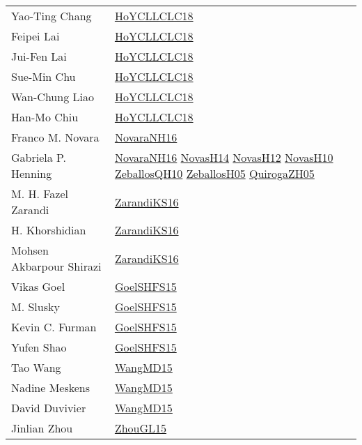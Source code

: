 {\begin{longtable}{p{4cm}p{15cm}}
Yao{-}Ting Chang & \href{papers/HoYCLLCLC18.pdf}{HoYCLLCLC18}\cite{HoYCLLCLC18} \\
Feipei Lai & \href{papers/HoYCLLCLC18.pdf}{HoYCLLCLC18}\cite{HoYCLLCLC18} \\
Jui{-}Fen Lai & \href{papers/HoYCLLCLC18.pdf}{HoYCLLCLC18}\cite{HoYCLLCLC18} \\
Sue{-}Min Chu & \href{papers/HoYCLLCLC18.pdf}{HoYCLLCLC18}\cite{HoYCLLCLC18} \\
Wan{-}Chung Liao & \href{papers/HoYCLLCLC18.pdf}{HoYCLLCLC18}\cite{HoYCLLCLC18} \\
Han{-}Mo Chiu & \href{papers/HoYCLLCLC18.pdf}{HoYCLLCLC18}\cite{HoYCLLCLC18} \\
Franco M. Novara & \href{articles/NovaraNH16.pdf}{NovaraNH16}\cite{NovaraNH16} \\
Gabriela P. Henning & \href{articles/NovaraNH16.pdf}{NovaraNH16}\cite{NovaraNH16} \href{articles/NovasH14.pdf}{NovasH14}\cite{NovasH14} \href{articles/NovasH12.pdf}{NovasH12}\cite{NovasH12} \href{articles/NovasH10.pdf}{NovasH10}\cite{NovasH10} \href{articles/ZeballosQH10.pdf}{ZeballosQH10}\cite{ZeballosQH10} \href{articles/ZeballosH05.pdf}{ZeballosH05}\cite{ZeballosH05} \href{papers/QuirogaZH05.pdf}{QuirogaZH05}\cite{QuirogaZH05} \\
M. H. Fazel Zarandi & \href{articles/ZarandiKS16.pdf}{ZarandiKS16}\cite{ZarandiKS16} \\
H. Khorshidian & \href{articles/ZarandiKS16.pdf}{ZarandiKS16}\cite{ZarandiKS16} \\
Mohsen Akbarpour Shirazi & \href{articles/ZarandiKS16.pdf}{ZarandiKS16}\cite{ZarandiKS16} \\
Vikas Goel & \href{articles/GoelSHFS15.pdf}{GoelSHFS15}\cite{GoelSHFS15} \\
M. Slusky & \href{articles/GoelSHFS15.pdf}{GoelSHFS15}\cite{GoelSHFS15} \\
Kevin C. Furman & \href{articles/GoelSHFS15.pdf}{GoelSHFS15}\cite{GoelSHFS15} \\
Yufen Shao & \href{articles/GoelSHFS15.pdf}{GoelSHFS15}\cite{GoelSHFS15} \\
Tao Wang & \href{articles/WangMD15.pdf}{WangMD15}\cite{WangMD15} \\
Nadine Meskens & \href{articles/WangMD15.pdf}{WangMD15}\cite{WangMD15} \\
David Duvivier & \href{articles/WangMD15.pdf}{WangMD15}\cite{WangMD15} \\
Jinlian Zhou & \href{papers/ZhouGL15.pdf}{ZhouGL15}\cite{ZhouGL15} \\

\end{longtable}}
